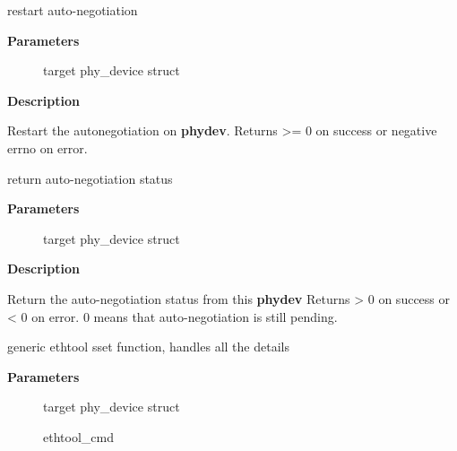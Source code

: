 \documentclass[a4paper,8pt,english]{sphinxmanual}
\begin{document}
\begin{fulllineitems}
\label{networking/kapi:c.phy_restart_aneg}
restart auto-negotiation

\end{fulllineitems}


\textbf{Parameters}
\begin{description}
\item[{}] \leavevmode
target phy\_device struct

\end{description}

\textbf{Description}

Restart the autonegotiation on \textbf{phydev}.  Returns \textgreater{}= 0 on success or
negative errno on error.

\begin{fulllineitems}
\label{networking/kapi:c.phy_aneg_done}
return auto-negotiation status

\end{fulllineitems}


\textbf{Parameters}
\begin{description}
\item[{}] \leavevmode
target phy\_device struct

\end{description}

\textbf{Description}

Return the auto-negotiation status from this \textbf{phydev}
Returns \textgreater{} 0 on success or \textless{} 0 on error. 0 means that auto-negotiation
is still pending.

\begin{fulllineitems}
\label{networking/kapi:c.phy_ethtool_sset}
generic ethtool sset function, handles all the details

\end{fulllineitems}


\textbf{Parameters}
\begin{description}
\item[{}] \leavevmode
target phy\_device struct

\item[{}] \leavevmode
ethtool\_cmd

\end{description}
\end{document}
